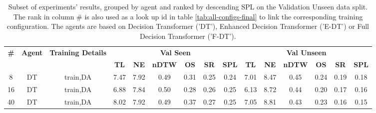 \begin{table}
\centering
\caption{\label{tab:dagger_prob}Subset of experiments' results, grouped by agent and ranked by descending SPL on the Validation Unseen data split. The rank in column \# is also used as a look up id in table \ref{tab:all-configs-final} to link the corresponding training configuration.     \newline The agents are based on Decision Transformer ('DT'), Enhanced Decision Transformer ('E-DT') or Full Decision Transformer ('F-DT').}
\begin{tabular}{@{\hskip3pt}c@{\hskip3pt}c@{\hskip3pt}c@{\hskip3pt}c@{\hskip3pt}c@{\hskip3pt}c@{\hskip3pt}c@{\hskip3pt}c@{\hskip3pt}c@{\hskip3pt}c@{\hskip3pt}c@{\hskip3pt}c@{\hskip3pt}c@{\hskip3pt}c@{\hskip3pt}c}
\toprule
\textbf{\#} & \textbf{Agent} & \textbf{Training Details} & \multicolumn{6}{c}{\textbf{Val Seen}} & \multicolumn{6}{c}{\textbf{Val Unseen}} \\
 \textbf{~} &     \textbf{~} &                \textbf{~} &       \textbf{TL} & \textbf{NE} & \textbf{nDTW} & \textbf{OS} & \textbf{SR} & \textbf{SPL} &         \textbf{TL} & \textbf{NE} & \textbf{nDTW} & \textbf{OS} & \textbf{SR} & \textbf{SPL} \\
\midrule
          8 &             DT &                  train,DA &              7.47 &        7.92 &          0.49 &        0.31 &        0.25 &         0.24 &                7.01 &        8.47 &          0.45 &        0.24 &        0.19 &         0.18 \\
         16 &             DT &                  train,DA &              6.88 &        7.84 &          0.50 &        0.28 &        0.26 &         0.25 &                6.13 &        8.72 &          0.44 &        0.20 &        0.17 &         0.16 \\
         40 &             DT &                  train,DA &              8.02 &        7.92 &          0.49 &        0.37 &        0.27 &         0.25 &                7.05 &        8.81 &          0.43 &        0.23 &        0.16 &         0.15 \\
\bottomrule
\end{tabular}
\end{table}
